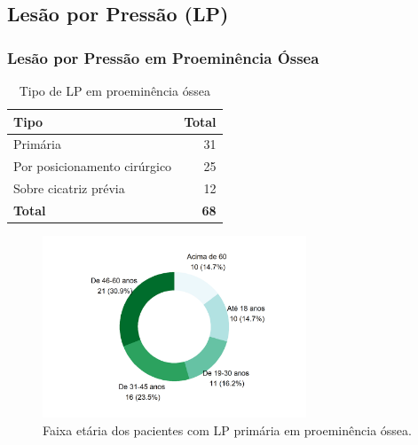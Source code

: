 \documentclass[
  a4paper]{article}
\begin{document}
\subsection{Lesão por Pressão (LP)}

\begin{table}[H]

\caption{\label{tab:unnamed-chunk-12}Tipo de Lesão por Pressão.}
\centering
{}
\end{table}

\subsubsection{Lesão por Pressão em Proeminência Óssea}

\begin{table}[H]

\caption{\label{tab:unnamed-chunk-13}Tipo de LP em proeminência óssea}
\centering
\begin{tabular}[t]{lr}
\toprule
Tipo & Total\\
\midrule
Primária & 31\\
Por posicionamento cirúrgico & 25\\
Sobre cicatriz prévia & 12\\
\midrule
\textbf{Total} & \textbf{68}\\
\bottomrule
\end{tabular}
\end{table}

\begin{figure}[H]
\caption{Faixa etária dos pacientes com LP primária em proeminência óssea.}
\includegraphics[width=0.7\textwidth]{Imagens/lesao_pressao_faixa_etaria.png}
\end{figure}
\end{document}
